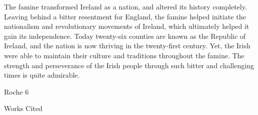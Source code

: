 \begin{Spacing}{1.5}

\hspace{.4in}The famine transformed Ireland as a nation, and altered its history completely. Leaving behind a bitter resentment for England, the famine helped initiate the nationalism and revolutionary movements of Ireland, which ultimately helped it gain its independence. Today twenty-six counties are known as the Republic of Ireland, and the nation is now thriving in the twenty-first century. Yet, the Irish were able to maintain their culture and traditions throughout the famine. The strength and perseverance of the Irish people through such bitter and challenging times is quite admirable. 

\newpage

\thispagestyle{empty}
\begin{flushright}Roche 6\end{flushright}
\begin{center}Works Cited\end{center}


\end{Spacing}
